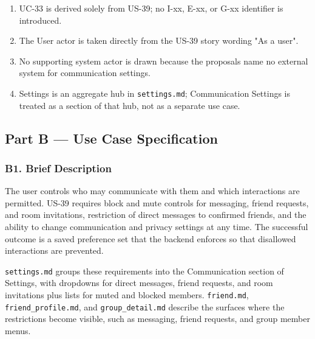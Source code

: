 \documentclass[12pt]{article}
\begin{document}
\begin{enumerate}
\item UC-33 is derived solely from US-39; no I-xx, E-xx, or G-xx identifier is introduced.
\item The User actor is taken directly from the US-39 story wording "As a user".
\item No supporting system actor is drawn because the proposals name no external system for communication settings.
\item Settings is an aggregate hub in \texttt{settings.md}; Communication Settings is treated as a section of that hub, not as a separate use case.
\end{enumerate}
\par\medskip

\hypertarget{sec:part-b-use-case-specification}{}
\subsection*{Part B --- Use Case Specification}
\par\medskip

\hypertarget{sec:b1-brief-description}{}
\subsubsection*{B1. Brief Description}
\par\medskip

The user controls who may communicate with them and which interactions are permitted. US-39 requires block and mute controls for messaging, friend requests, and room invitations, restriction of direct messages to confirmed friends, and the ability to change communication and privacy settings at any time. The successful outcome is a saved preference set that the backend enforces so that disallowed interactions are prevented.
\par\medskip

\texttt{settings.md} groups these requirements into the Communication section of Settings, with dropdowns for direct messages, friend requests, and room invitations plus lists for muted and blocked members. \texttt{friend.md}, \texttt{friend\_profile.md}, and \texttt{group\_detail.md} describe the surfaces where the restrictions become visible, such as messaging, friend requests, and group member menus.
\par\medskip
\end{document}
